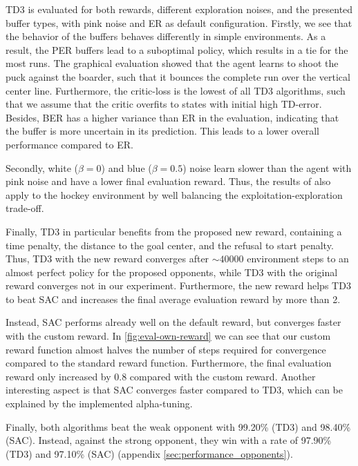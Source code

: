 \ac{TD3} is evaluated for both rewards, different exploration noises, and the presented buffer types, with pink noise and \ac{ER} as default configuration. Firstly, we see that the behavior of the buffers behaves differently in simple environments. As a result, the \ac{PER} buffers lead to a suboptimal policy, which results in a tie for the most runs. The graphical evaluation showed that the agent learns to shoot the puck against the boarder, such that it bounces the complete run over the vertical center line. Furthermore, the critic-loss is the lowest of all \ac{TD3} algorithms, such that we assume that the critic overfits to states with initial high \ac{TD}-error. Besides, \ac{BER} has a higher variance than \ac{ER} in the evaluation, indicating that the buffer is more uncertain in its prediction. This leads to a lower overall performance compared to \ac{ER}.

Secondly, white ($\beta = 0$) and blue ($\beta = 0.5$) noise learn slower than the agent with pink noise and have a lower final evaluation reward. Thus, the results of \cite{eberhard2023pink} also apply to the hockey environment by well balancing the exploitation-exploration trade-off.

Finally, \ac{TD3} in particular benefits from the proposed new reward, containing a time penalty, the distance to the goal center, and the refusal to start penalty. Thus, \ac{TD3} with the new reward converges after $\sim 40000$ environment steps to an almost perfect policy for the proposed opponents, while \ac{TD3} with the original reward converges not in our experiment. Furthermore, the new reward helps \ac{TD3} to beat \ac{SAC} and increases the final average evaluation reward by more than 2.

Instead, \ac{SAC} performs already well on the default reward, but converges faster with the custom reward. In \autoref{fig:eval-own-reward} we can see that our custom reward function almost halves the number of steps required for convergence compared to the standard reward function. Furthermore, the final evaluation reward only increased by 0.8 compared with the custom reward. Another interesting aspect is that \ac{SAC} converges faster compared to \ac{TD3}, which can be explained by the implemented alpha-tuning.

Finally, both algorithms beat the weak opponent with 99.20\% (\ac{TD3}) and 98.40\% (\ac{SAC}). Instead, against the strong opponent, they win with a rate of 97.90\% (\ac{TD3}) and 97.10\% (\ac{SAC}) (appendix \ref{sec:performance_opponents}).
